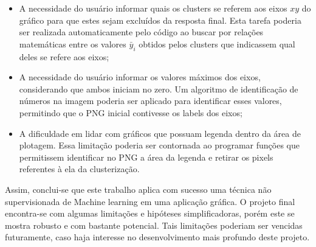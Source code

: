 \documentclass{article}
\begin{document}
    \begin{itemize}
        \item A necessidade do usuário informar quais os clusters se referem aos eixos $xy$ do gráfico para que estes sejam excluídos da resposta final. Esta tarefa poderia ser realizada automaticamente pelo código ao buscar por relações matemáticas entre os valores $\bar{y}_i$ obtidos pelos clusters que indicassem qual deles se refere aos eixos;
        \item A necessidade do usuário informar os valores máximos dos eixos, considerando que ambos iniciam no zero. Um algoritmo de identificação de números na imagem poderia ser aplicado para identificar esses valores, permitindo que o PNG inicial contivesse os labels dos eixos;
        \item A dificuldade em lidar com gráficos que possuam legenda dentro da área de plotagem. Essa limitação poderia ser contornada ao programar funções que permitissem identificar no PNG a área da legenda e retirar os pixels referentes à ela da clusterização.
    \end{itemize}
    
    Assim, conclui-se que este trabalho aplica com sucesso uma técnica não supervisionada de Machine learning em uma aplicação gráfica. O projeto final encontra-se com algumas limitações e hipóteses simplificadoras, porém este se mostra robusto e com bastante potencial. Tais limitações poderiam ser vencidas futuramente, caso haja interesse no desenvolvimento mais profundo deste projeto.
\end{document}
